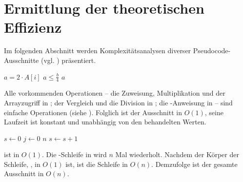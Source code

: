 



\section{Ermittlung der theoretischen Effizienz}
\label{sec:te-ermittlung}

Im folgenden Abschnitt werden Komplexitätsanalysen diverser Pseudocode-Ausschnitte (vgl. \cite[69]{sha2011}) präsentiert.

\begin{codebox}
    \li $a = 2 \cdot A[i]$          \label{ln:ex1-setup}
    \li \If $a \leq \frac{b}{4}$    \label{ln:ex1-if}
    \li     \Then
                \Return $a$         \label{ln:ex1-return}
            \End
\end{codebox}

Alle vorkommenden Operationen -- die Zuweisung, Multiplikation und der Arrayzugriff in ; der Vergleich und die Division in ; die \Return-Anweisung in  -- sind einfache Operationen (siehe ). Folglich ist der Ausschnitt in $O(1)$, seine Laufzeit ist konstant und unabhängig von den behandelten Werten.

\begin{codebox}
    \li $s \gets 0$                 \label{ln:ex2-outer-assignment}
    \li \For $j \gets 0$ \To $n$    \label{ln:ex2-for}
    \li     \Do
                $s \gets s + 1$     \label{ln:ex2-inner-assignment}
            \End
\end{codebox}

 ist in $O(1)$. Die \For-Schleife in  wird $n$ Mal wiederholt. Nachdem der Körper der Schleife, , in $O(1)$ ist, ist die Schleife in $O(n)$. Demzufolge ist der gesamte Ausschnitt in $O(n)$.

